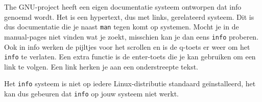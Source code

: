 The GNU-project heeft een eigen documentatie systeem ontworpen dat info genoemd wordt. Het is een hypertext, dus met links, gerelateerd systeem. Dit is dus documentatie die je naast \texttt{man} tegen komt op systemen. Mocht je in de manual-pages niet vinden wat je zoekt, misschien kan je dan eens \texttt{info} proberen. Ook in info werken de pijltjes voor het scrollen en is de q-toets er weer om het \texttt{info} te verlaten. Een extra functie is de enter-toets die je kan gebruiken om een link te volgen. Een link herken je aan een onderstreepte tekst.

Het \texttt{info} systeem is niet op iedere Linux-distributie standaard ge\"installeerd, het kan dus gebeuren dat \texttt{info} op jouw systeem niet werkt.

